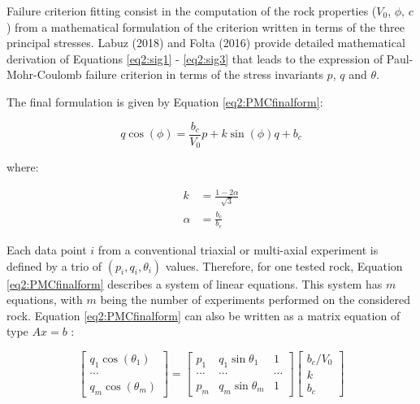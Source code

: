 Failure criterion fitting consist in the computation of the rock properties ($V_0$, $\phi$, $c$ ) from a mathematical formulation of the criterion written in terms of the three principal stresses. Labuz (2018) \cite{Labuz2018} and Folta (2016) \cite{Folta2016} provide detailed mathematical derivation of Equations \ref{eq2:sig1} - \ref{eq2:sig3} that leads to the expression of Paul-Mohr-Coulomb failure criterion in terms of the stress invariants $p$, $q$  and $\theta$. 

The final formulation is given by Equation \ref{eq2:PMCfinalform}:

\begin{equation}\label{eq2:PMCfinalform}
    q\cos(\phi) = \frac{b_c}{V_0}p+k\sin(\phi)q+b_c
\end{equation}

where:

\begin{align}
    k &= \frac{1-2\alpha }{\sqrt{3}}\\
    \alpha &= \frac{b_c}{b_e}
\end{align}

Each data point $i$ from a conventional triaxial or multi-axial experiment is defined by a trio of $(p_i,q_i,\theta_i)$ values. Therefore, for one tested rock, Equation \ref{eq2:PMCfinalform} describes a system of linear equations. This system has $m$  equations, with $m$ being the number of experiments performed on the considered rock. Equation \ref{eq2:PMCfinalform} can also be written as a matrix equation of type $Ax=b$ :

\begin{equation}\label{eq2:mat-eq}
    \left[\begin{array}{c}
    {q_{1} \cos \left(\theta_{1}\right)} \\
    {\cdots} \\
    {q_{m} \cos \left(\theta_{m}\right)}
    \end{array}\right]=\left[\begin{array}{ccc}
    {p_{1}} & {q_{1} \sin \theta_{1}} & {1} \\
    {\cdots} & {\cdots} & {\cdots} \\
    {p_{m}} & {q_{m} \sin \theta_{m}} & {1}
    \end{array}\right]\left[\begin{array}{c}
    {b_{c} / V_{0}} \\
    {k} \\
    {b_{c}}
    \end{array}\right]
\end{equation}

